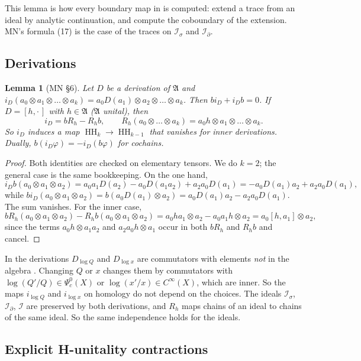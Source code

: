 \documentclass[11pt,oneside,reqno]{article}
\DeclareMathOperator{\HH}{HH}
\newcommand{\cI}{\mathcal I}
\newcommand{\Is}{\mathcal I_\sigma}
\newcommand{\Id}{\mathcal I_\partial}
\newcommand{\Psic}{\Psi_{c}}
\newcommand{\CI}{C^\infty}
\newcommand{\lQ}{\log Q}
\newcommand{\lx}{\log x}
\theoremstyle{plain}
\newtheorem{lemma}[theorem]{Lemma}
\theoremstyle{definition}
\theoremstyle{remark}
\begin{document}
This lemma is how every boundary map in \cite{MN} is computed: extend a
trace from an ideal by analytic continuation, and compute the coboundary of
the extension. MN's formula (17) is the case of the traces on \(\Is\) and
\(\Id\).

\subsection{Derivations}\label{subsec:derivations}

\begin{lemma}[MN \S6]\label{lem:iD}
Let \(D\) be a derivation of \(\mathfrak A\) and
\(i_D(a_0\otimes a_1\otimes\dots\otimes a_k)=a_0D(a_1)\otimes a_2\otimes
\dots\otimes a_k\). Then \(bi_D+i_Db=0\). If \(D=[h,\cdot\,]\) with
\(h\in\mathfrak A\) (\(\mathfrak A\) unital), then
\[
 i_D=bR_h-R_hb,\qquad R_h(a_0\otimes\dots\otimes a_k)=a_0h\otimes a_1
 \otimes\dots\otimes a_k .
\]
So \(i_D\) induces a map \(\HH_k\to\HH_{k-1}\) that vanishes for inner
derivations. Dually, \(b(i_D\varphi)=-i_D(b\varphi)\) for cochains.
\end{lemma}

\begin{proof}
Both identities are checked on elementary tensors. We do \(k=2\); the
general case is the same bookkeeping. On the one hand,
\[
 i_Db(a_0\otimes a_1\otimes a_2)=a_0a_1D(a_2)-a_0D(a_1a_2)+a_2a_0D(a_1)
 =-a_0D(a_1)a_2+a_2a_0D(a_1),
\]
while \(bi_D(a_0\otimes a_1\otimes a_2)=b(a_0D(a_1)\otimes a_2)=
a_0D(a_1)a_2-a_2a_0D(a_1)\). The sum vanishes. For the inner case,
\[
 bR_h(a_0\otimes a_1\otimes a_2)-R_hb(a_0\otimes a_1\otimes a_2)
 =a_0ha_1\otimes a_2-a_0a_1h\otimes a_2=a_0[h,a_1]\otimes a_2 ,
\]
since the terms \(a_0h\otimes a_1a_2\) and \(a_2a_0h\otimes a_1\) occur in
both \(bR_h\) and \(R_hb\) and cancel.
\end{proof}

In \cite{MN} the derivations \(D_{\lQ}\) and \(D_{\lx}\) are commutators
with elements \emph{not} in the algebra \cite[(63)--(64)]{MN}. Changing
\(Q\) or \(x\) changes them by commutators with
\(\log(Q'/Q)\in\Psic^0(X)\) or \(\log(x'/x)\in\CI(X)\), which are inner.
So the maps \(i_{\lQ}\) and \(i_{\lx}\) on homology do not depend on the
choices. The ideals \(\Is\), \(\Id\), \(\cI\) are preserved by both
derivations, and \(R_h\) maps chains of an ideal to chains of the same
ideal. So the same independence holds for the ideals.

\subsection{Explicit H-unitality contractions}\label{subsec:Hunital}
\end{document}
